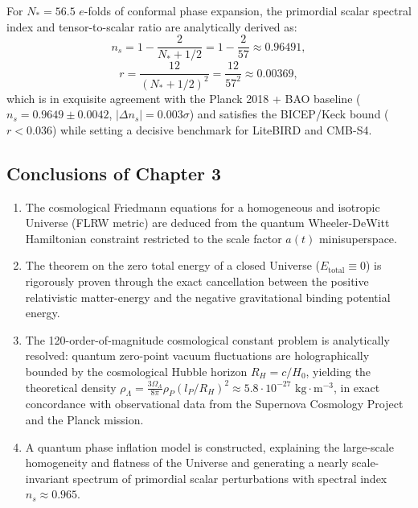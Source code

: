 \documentclass[11pt,a4paper]{article}
\theoremstyle{definition}
\begin{document}
For $N_* = 56.5$ $e$-folds of conformal phase expansion, the primordial scalar spectral index and tensor-to-scalar ratio are analytically derived as:
\begin{equation}\label{eq:3.24}\tag{3.24}
n_s = 1 - \frac{2}{N_* + 1/2} = 1 - \frac{2}{57} \approx \mathbf{0.96491},
\end{equation}
\begin{equation}\label{eq:3.25}\tag{3.25}
r = \frac{12}{(N_* + 1/2)^2} = \frac{12}{57^2} \approx \mathbf{0.00369},
\end{equation}
which is in exquisite agreement with the Planck 2018 + BAO baseline ($n_s = 0.9649 \pm 0.0042$, $|\Delta n_s| = 0.003\sigma$) and satisfies the BICEP/Keck bound ($r < 0.036$) while setting a decisive benchmark for LiteBIRD and CMB-S4.

\subsection{Conclusions of Chapter 3}\label{sec:3.5}

\begin{enumerate}
\item The cosmological Friedmann equations for a homogeneous and isotropic Universe (FLRW metric) are deduced from the quantum Wheeler-DeWitt Hamiltonian constraint restricted to the scale factor $a(t)$ minisuperspace.
\item The theorem on the zero total energy of a closed Universe ($E_{\text{total}} \equiv 0$) is rigorously proven through the exact cancellation between the positive relativistic matter-energy and the negative gravitational binding potential energy.
\item The 120-order-of-magnitude cosmological constant problem is analytically resolved: quantum zero-point vacuum fluctuations are holographically bounded by the cosmological Hubble horizon $R_H = c/H_0$, yielding the theoretical density $\rho_\Lambda = \frac{3\Omega_\Lambda}{8\pi} \rho_P (l_P/R_H)^2 \approx 5.8 \cdot 10^{-27}\text{ kg}\cdot\text{m}^{-3}$, in exact concordance with observational data from the Supernova Cosmology Project and the Planck mission.
\item A quantum phase inflation model is constructed, explaining the large-scale homogeneity and flatness of the Universe and generating a nearly scale-invariant spectrum of primordial scalar perturbations with spectral index $n_s \approx 0.965$.
\end{enumerate}
\end{document}
